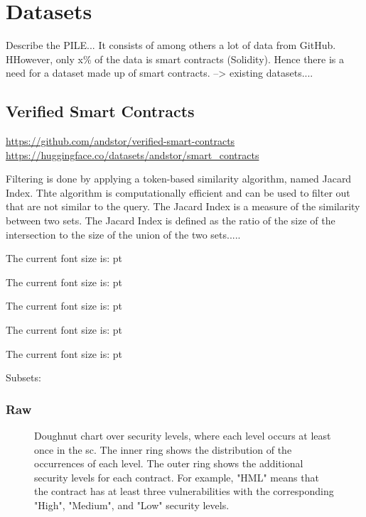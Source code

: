 \section{Datasets}
Describe the  PILE...  It consists  of among others a lot of data from GitHub. HHowever, only x\% of the data is smart contracts (Solidity). Hence there is a need  for a dataset made up of smart contracts. --> existing datasets....

\subsection{Verified Smart Contracts}
\label{sec:verified-smart-contracts}
\url{https://github.com/andstor/verified-smart-contracts}
\url{https://huggingface.co/datasets/andstor/smart_contracts}


Filtering is done by applying a token-based similarity algorithm, named Jacard Index. Thte algorithm  is computationally efficient and can be used to filter out  that are not similar to the query. The Jacard Index is a measure of the similarity between two sets. The Jacard Index is defined as the ratio of the size of the intersection to the size of the union of the two sets.....

\makeatletter
\newcommand\thefontsize[1]{{#1 The current font size is: \f@size pt\par}}
\makeatother

\thefontsize\tiny
\thefontsize\footnotesize
\thefontsize\small
\thefontsize\normalsize
\thefontsize\large

\tmp\tmp

\tmp\tmp

\tmp\tmp

\prntlen{\textwidth}

Subsets:
\subsubsection{Raw}
\label{sec:verified-smart-contracts-raw}


\begin{figure}[ht]
    \centering
    
    \caption{Doughnut chart over security levels, where each level occurs at least once in the \acrshort{sc}. The inner ring shows the distribution of the occurrences of each level. The outer ring shows the additional security levels for each contract. For example, "HML" means that the contract has at least three vulnerabilities with the corresponding "High", "Medium", and "Low" security levels.}
\end{figure}



